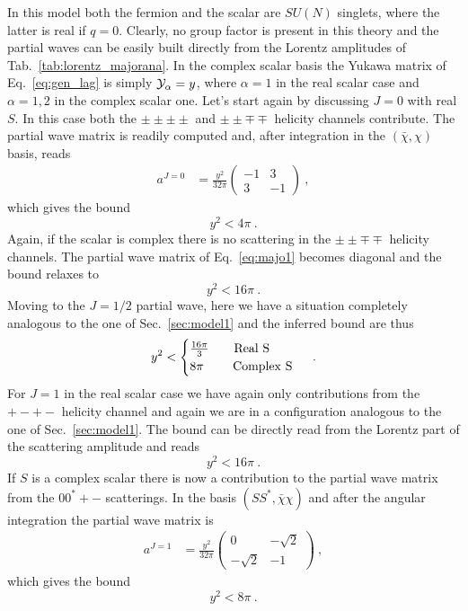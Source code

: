\documentclass[a4paper,11pt]{article}
\newcommand{\be}{\begin{equation}}
\newcommand{\ee}{\end{equation}}
\begin{document}
In this model both the fermion and the scalar are $SU(N)$ singlets, where the latter is real if $q=0$. Clearly, no group factor is present in this theory and the partial waves can be easily built directly from the Lorentz amplitudes of Tab.~\ref{tab:lorentz_majorana}. In the complex scalar basis the Yukawa matrix of Eq.~\eqref{eq:gen_lag} is simply ${\cal Y}_\alpha=y$, where $\alpha=1$ in the real scalar case and $\alpha=1,2$ in the complex scalar one. Let's start again by discussing $J=0$ with real $S$. In this case both the $\pm\pm\pm\pm$ and $\pm\pm\mp\mp$ helicity channels contribute. The partial wave matrix is readily computed and, after integration in the $(\bar \chi,\chi)$ basis, reads
\begin{align}
\label{eq:majo1}
a^{J=0}& =\frac{y^2}{32\pi} 
\begin{pmatrix}
-1 & 3 \\
3 & -1
\end{pmatrix} \ ,
\end{align}
which gives the bound
\be
y^2 < 4\pi \ .
\ee
Again, if the scalar is complex there is no scattering in the $\pm\pm\mp\mp$ helicity channels. The partial wave matrix of Eq.~\eqref{eq:majo1} becomes diagonal and the bound relaxes to
\be
y^2 < 16\pi \ .
\ee
Moving to the $J=1/2$ partial wave, here we have a situation completely analogous to the one of Sec.~\ref{sec:model1} and the inferred bound are thus
\be
y^2 <
\begin{cases}
\frac{16\pi}{3} \qquad {\rm Real}~$S$ \\
8\pi \qquad \,\,{\rm Complex}~$S$
\end{cases} \ .
\ee
For $J=1$ in the real scalar case we have again only contributions from the $+-+-$ helicity channel and again we are in a configuration analogous to the one of  Sec.~\ref{sec:model1}. The bound can be directly read from the Lorentz part of the scattering amplitude and reads
\be
y^2 < 16\pi \ .
\ee
If $S$ is a complex scalar there is now a contribution to the partial wave matrix from the $00^*+-$ scatterings. In the basis $(SS^*,\bar\chi\chi)$ and after the angular integration the partial wave matrix is
\begin{align}
\label{eq:majo1_J1}
a^{J=1}& =\frac{y^2}{32\pi} 
\begin{pmatrix}
0 & -\sqrt 2 \\
-\sqrt 2 & -1
\end{pmatrix} \ ,
\end{align} 
which gives the bound
\be
y^2 < 8\pi \ .
\ee
\end{document}
